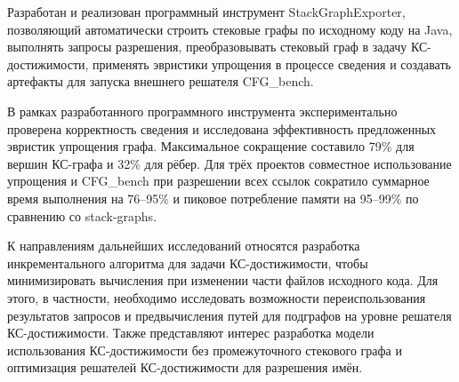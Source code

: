 Разработан и реализован программный инструмент StackGraphExporter, позволяющий автоматически строить стековые графы по исходному коду на Java, выполнять запросы разрешения, преобразовывать стековый граф в задачу КС-достижимости, применять эвристики упрощения в процессе сведения и создавать артефакты для запуска внешнего решателя CFG\_bench.

В рамках разработанного программного инструмента экспериментально проверена корректность сведения и исследована эффективность предложенных эвристик упрощения графа. Максимальное сокращение составило 79\% для вершин КС-графа и 32\% для рёбер. Для трёх проектов совместное использование упрощения и CFG\_bench при разрешении всех ссылок сократило суммарное время выполнения на 76--95\% и пиковое потребление памяти на 95--99\% по сравнению со stack-graphs.

К направлениям дальнейших исследований относятся разработка инкрементального алгоритма для задачи КС-достижимости, чтобы минимизировать вычисления при изменении части файлов исходного кода. Для этого, в частности, необходимо исследовать возможности переиспользования результатов запросов и предвычисления путей для подграфов на уровне решателя КС-достижимости. Также представляют интерес разработка модели использования КС-достижимости без промежуточного стекового графа и оптимизация решателей КС-достижимости для разрешения имён.
